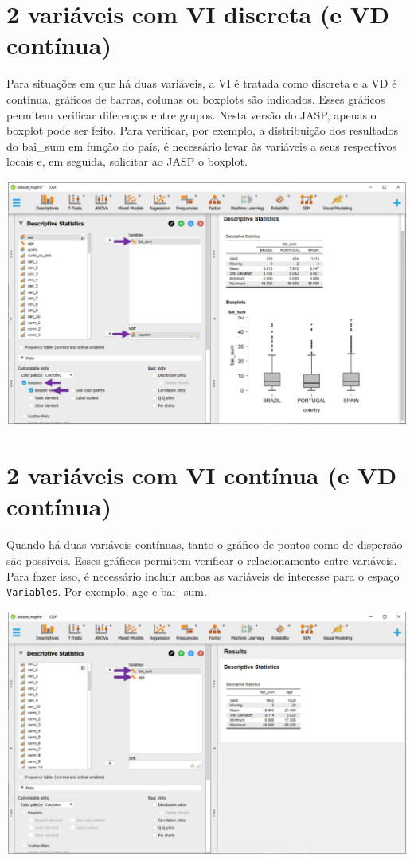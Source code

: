 \documentclass[
]{book}
\begin{document}
\hypertarget{variuxe1veis-com-vi-discreta-e-vd-contuxednua-1}{%
\section{2 variáveis com VI discreta (e VD contínua)}\label{variuxe1veis-com-vi-discreta-e-vd-contuxednua-1}}

Para situações em que há duas variáveis, a VI é tratada como discreta e a VD é contínua, gráficos de barras, colunas ou boxplots são indicados. Esses gráficos permitem verificar diferenças entre grupos. Nesta versão do JASP, apenas o boxplot pode ser feito. Para verificar, por exemplo, a distribuição dos resultados do bai\_sum em função do país, é necessário levar às variáveis a seus respectivos locais e, em seguida, solicitar ao JASP o boxplot.

\includegraphics{./img/cap_desc_jasp_grafico_boxplot_grupo.png}

\hypertarget{variuxe1veis-com-vi-contuxednua-e-vd-contuxednua-1}{%
\section{2 variáveis com VI contínua (e VD contínua)}\label{variuxe1veis-com-vi-contuxednua-e-vd-contuxednua-1}}

Quando há duas variáveis contínuas, tanto o gráfico de pontos como de dispersão são possíveis. Esses gráficos permitem verificar o relacionamento entre variáveis. Para fazer isso, é necessário incluir ambas as variáveis de interesse para o espaço \texttt{Variables}. Por exemplo, age e bai\_sum.

\includegraphics{./img/cap_desc_jasp_grafico_scatter1.png}
\end{document}
